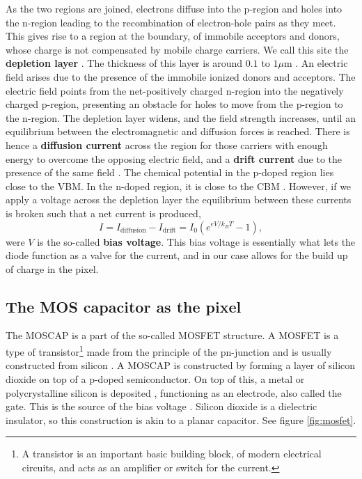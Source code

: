 \documentclass[../main.tex]{subfiles}
\begin{document}
	As the two regions are joined, electrons diffuse into the p-region and holes into the n-region leading to the recombination of electron-hole pairs as they meet. This gives rise to a region at the boundary, of immobile acceptors and donors, whose charge is not compensated by mobile charge carriers. We call this site the \textbf{depletion layer} \cite{solidstatephysicsbook}. The thickness of this layer is around $0.1$ to $1 \mu$m \cite{solidstatephysicsbook}. An electric field arises due to the presence of the immobile ionized donors and acceptors. The electric field points from the net-positively charged n-region into the negatively charged p-region, presenting an obstacle for holes to move from the p-region to the n-region. The depletion layer widens, and the field strength increases, until an equilibrium between the electromagnetic and diffusion forces is reached. There is hence a \textbf{diffusion current} across the region for those carriers with enough energy to overcome the opposing electric field, and a \textbf{drift current} due to the presence of the same field \cite{solidstatephysicsbook}. The chemical potential in the p-doped region lies close to the VBM. In the n-doped region, it is close to the CBM \cite{solidstatephysicsbook} . However, if we apply a voltage across the depletion layer the equilibrium between these currents is broken such that a net current\cite{solidstatephysicsbook} is produced,
	\begin{equation}
		I = I_\text{diffusion} - I_\text{drift} = I_0\left(e^{eV/k_BT}-1\right),
	\end{equation}
	were $V$ is the so-called \textbf{bias voltage}. This bias voltage is essentially what lets the diode function as a valve for the current, and in our case allows for the build up of charge in the pixel.
	
	\subsection{The MOS capacitor as the pixel}
	The MOSCAP is a part of the so-called MOSFET structure. A MOSFET is a type of transistor\footnote{A transistor is an important basic building block, of modern electrical circuits, and acts as an amplifier or switch for the current.} made from the principle of the pn-junction and is usually constructed from silicon \cite{comphistmus}. A MOSCAP is constructed by forming a layer of silicon dioxide on top of a p-doped semiconductor. On top of this, a metal or polycrystalline silicon is deposited \cite{ccdwiki}, functioning as an electrode, also called the gate. This is the source of the bias voltage \cite{solidstatephysicsbook}. Silicon dioxide is a dielectric insulator, so this construction is akin to a planar capacitor. See figure \ref{fig:mosfet}.
	
\end{document}
